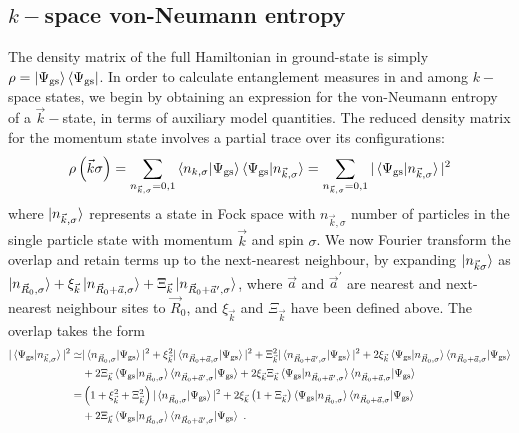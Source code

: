 \documentclass{report}
\numberwithin{equation}{section}
\begin{document}
\subsection{\(k-\)space von-Neumann entropy}
The density matrix of the full Hamiltonian in ground-state is simply \(\rho = \ket{\Psi_\text{gs}}\bra{\Psi_\text{gs}}\). In order to calculate entanglement measures in and among \(k-\)space states, we begin by obtaining an expression for the von-Neumann entropy of a \(\vec k-\)state, in terms of auxiliary model quantities. The reduced density matrix for the momentum state involves a partial trace over its configurations:
\begin{equation}\begin{aligned}
	\rho\left(\vec k\sigma\right) = \sum_{n_{\vec k,\sigma}=0,1}\braket{n_{k,\sigma} | \Psi_\text{gs}}\braket{\Psi_\text{gs} | n_{\vec k,\sigma}} = \sum_{n_{\vec k,\sigma}=0,1}|\braket{\Psi_\text{gs} | n_{\vec k,\sigma}}|^2
\end{aligned}\end{equation}
where \(\ket{n_{\vec k,\sigma}}\) represents a state in Fock space with \(n_{\vec k,\sigma}\) number of particles in the single particle state with momentum \(\vec k\) and spin \(\sigma\). We now Fourier transform the overlap and retain terms up to the next-nearest neighbour, by expanding \(\ket{n_{\vec k\sigma}}\) as \(\ket{n_{\vec R_0,\sigma}} + \xi_{\vec k}\ket{n_{\vec R_0 + \vec a,\sigma}} + \Xi_{\vec k}\ket{n_{\vec R_0 + \vec a^\prime,\sigma}}\), where \(\vec a\) and \(\vec a^\prime\) are nearest and next-nearest neighbour sites to \(\vec R_0\), and \(\xi_{\vec k}\) and \(\Xi_{\vec k}\) have been defined above. The overlap takes the form
\begin{equation}\begin{aligned}
	|\braket{\Psi_\text{gs} | n_{\vec k,\sigma}}|^2 \simeq& |\braket{n_{\vec R_0,\sigma} | \Psi_\text{gs}}|^2  + \xi_{\vec k}^2|\braket{n_{\vec R_0 + \vec a,\sigma} | \Psi_\text{gs}}|^2 + \Xi_{\vec k}^2|\braket{n_{\vec R_0 + \vec a^\prime,\sigma} | \Psi_\text{gs}}|^2 + 2\xi_{\vec k}\braket{\Psi_\text{gs} | n_{\vec R_0,\sigma}}\braket{n_{\vec R_0 + \vec a,\sigma} | \Psi_\text{gs}}\\
							      & + 2\Xi_{\vec k}\braket{\Psi_\text{gs} | n_{\vec R_0,\sigma}}\braket{n_{\vec R_0 + \vec a^\prime,\sigma} | \Psi_\text{gs}} + 2\xi_{\vec k}\Xi_{\vec k}\braket{\Psi_\text{gs} | n_{\vec R_0 + \vec a^\prime,\sigma}}\braket{n_{\vec R_0 + \vec a,\sigma} | \Psi_\text{gs}}\\
	=& \left(1 + \xi_{\vec k}^2 + \Xi_{\vec k}^2\right)|\braket{n_{\vec R_0,\sigma} | \Psi_\text{gs}}|^2 + 2\xi_{\vec k}\left(1 + \Xi_{\vec k}\right)\braket{\Psi_\text{gs} | n_{\vec R_0,\sigma}}\braket{n_{\vec R_0 + \vec a,\sigma} | \Psi_\text{gs}} \\
	 & + 2\Xi_{\vec k}\braket{\Psi_\text{gs} | n_{\vec R_0,\sigma}}\braket{n_{\vec R_0 + \vec a^\prime,\sigma} | \Psi_\text{gs}}~.\label{overlap_ftransform}
\end{aligned}\end{equation}
\end{document}
